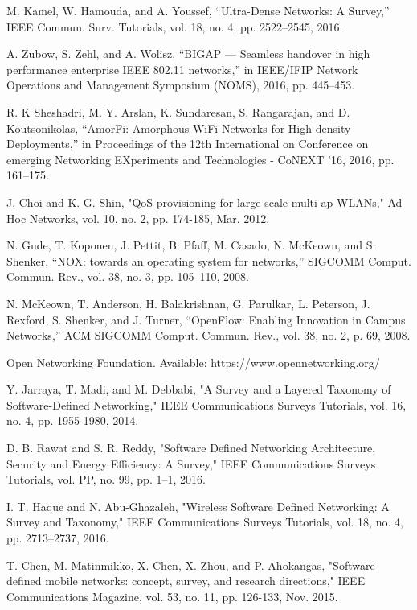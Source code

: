 \begin{thebibliography}{1}
 M. Kamel, W. Hamouda, and A. Youssef, “Ultra-Dense Networks: A Survey,” IEEE Commun. Surv. Tutorials, vol. 18, no. 4, pp. 2522–2545, 2016.

 A. Zubow, S. Zehl, and A. Wolisz, “BIGAP — Seamless handover in high performance enterprise IEEE 802.11 networks,” in IEEE/IFIP Network Operations and Management Symposium (NOMS), 2016, pp. 445–453.

 R. K Sheshadri, M. Y. Arslan, K. Sundaresan, S. Rangarajan, and D. Koutsonikolas, “AmorFi: Amorphous WiFi Networks for High-density Deployments,” in Proceedings of the 12th International on Conference on emerging Networking EXperiments and Technologies - CoNEXT ’16, 2016, pp. 161–175.


 J. Choi and K. G. Shin, "QoS provisioning for large-scale multi-ap WLANs," Ad Hoc Networks, vol. 10, no. 2, pp. 174-185, Mar. 2012.

 N. Gude, T. Koponen, J. Pettit, B. Pfaff, M. Casado, N. McKeown, and S. Shenker, “NOX: towards an operating system for networks,” SIGCOMM Comput. Commun. Rev., vol. 38, no. 3, pp. 105–110, 2008.

 N. McKeown, T. Anderson, H. Balakrishnan, G. Parulkar, L. Peterson, J. Rexford, S. Shenker, and J. Turner, “OpenFlow: Enabling Innovation in Campus Networks,” ACM SIGCOMM Comput. Commun. Rev., vol. 38, no. 2, p. 69, 2008.

 Open Networking Foundation. Available: https://www.opennetworking.org/

 Y. Jarraya, T. Madi, and M. Debbabi, "A Survey and a Layered Taxonomy of Software-Defined Networking," IEEE Communications Surveys Tutorials, vol. 16, no. 4, pp. 1955-1980, 2014.

 D. B. Rawat and S. R. Reddy, "Software Defined Networking Architecture, Security and Energy Efficiency: A Survey," IEEE Communications Surveys Tutorials, vol. PP, no. 99, pp. 1–1, 2016.

 I. T. Haque and N. Abu-Ghazaleh, "Wireless Software Defined Networking: A Survey and Taxonomy," IEEE Communications Surveys Tutorials, vol. 18, no. 4, pp. 2713–2737, 2016.

 T. Chen, M. Matinmikko, X. Chen, X. Zhou, and P. Ahokangas, "Software defined mobile networks: concept, survey, and research directions," IEEE Communications Magazine, vol. 53, no. 11, pp. 126-133, Nov. 2015.


\end{thebibliography}
